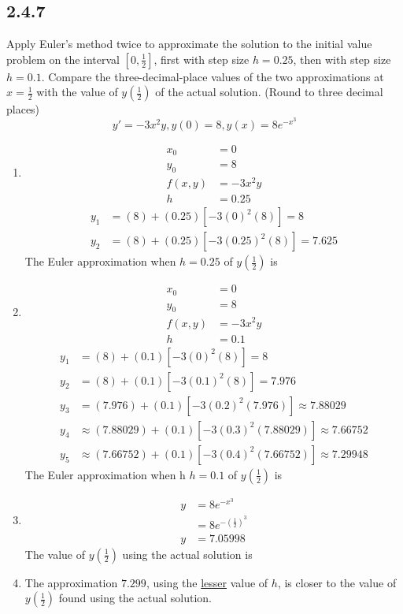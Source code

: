 \documentclass{article}
\begin{document}
\subsection{2.4.7}
Apply Euler's method twice to approximate the solution to the initial value problem on the interval $ \left[ 0,\frac{1}{2} \right] $, first with step size $ h = 0.25 $, then with step size $ h = 0.1 $. Compare the three-decimal-place values of the two approximations at $ x = \frac{1}{2} $ with the value of $ y \left( \frac{1}{2} \right) $ of the actual solution. (Round to three decimal places)
$$ y' = -3x^2y, y(0) = 8, y(x) = 8e^{-x^3} $$
\begin{enumerate}[label=\textbf{(\alph*)}]
	\item
		\begin{align*}
			x_0 & = 0 \\
			y_0 & = 8 \\
			f(x,y) & = -3x^2y \\
			h & = 0.25
		\end{align*}
		\begin{align*}
			y_1 & = (8) + (0.25) \left[ -3(0)^2(8) \right] = 8 \\
			y_2 & = (8) + (0.25) \left[ -3(0.25)^2(8) \right] = 7.625
		\end{align*}
		The Euler approximation when $ h = 0.25 $ of $ y \left( \frac{1}{2} \right) $ is 
	\item
		\begin{align*}
			x_0 & = 0 \\
			y_0 & = 8 \\
			f(x,y) & = -3x^2y \\
			h & = 0.1
		\end{align*}
		\begin{align*}
			y_1 & = (8) + (0.1) \left[ -3(0)^2(8) \right] = 8 \\
			y_2 & = (8) + (0.1) \left[ -3(0.1)^2(8) \right] = 7.976 \\
			y_3 & = (7.976) + (0.1) \left[ -3(0.2)^2(7.976) \right] \approx 7.88029 \\
			y_4 & \approx (7.88029) + (0.1) \left[ -3(0.3)^2(7.88029) \right] \approx 7.66752 \\
			y_5 & \approx (7.66752) + (0.1) \left[ -3(0.4)^2(7.66752) \right] \approx 7.29948
		\end{align*}
		The Euler approximation when h $ h = 0.1 $ of $ y \left( \frac{1}{2} \right) $ is 
	\item
		\begin{align*}
			y & = 8e^{-x^3} \\
			  & = 8e^{-(\frac{1}{2})^3} \\
			y & = 7.05998
		\end{align*}
		The value of $ y \left( \frac{1}{2} \right) $ using the actual solution is 
	\item
		The approximation $ 7.299 $, using the \underline{lesser} value of $ h $, is closer to the value of $ y \left( \frac{1}{2} \right) $ found using the actual solution.
\end{enumerate}
\end{document}
